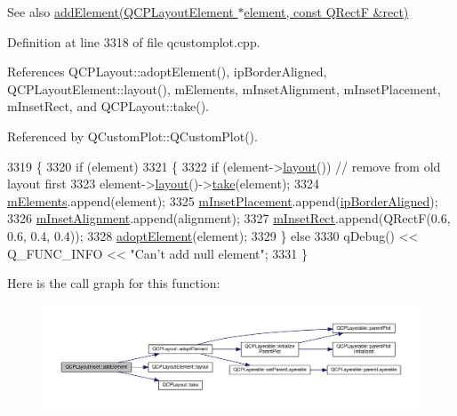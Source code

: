 \begin{DoxySeeAlso}{See also}
\hyperlink{class_q_c_p_layout_inset_a8ff61fbee4a1f0ff45c398009d9f1e56}{add\+Element(\+Q\+C\+P\+Layout\+Element $\ast$element, const Q\+Rect\+F \&rect)} 
\end{DoxySeeAlso}


Definition at line 3318 of file qcustomplot.\+cpp.



References Q\+C\+P\+Layout\+::adopt\+Element(), ip\+Border\+Aligned, Q\+C\+P\+Layout\+Element\+::layout(), m\+Elements, m\+Inset\+Alignment, m\+Inset\+Placement, m\+Inset\+Rect, and Q\+C\+P\+Layout\+::take().



Referenced by Q\+Custom\+Plot\+::\+Q\+Custom\+Plot().


\begin{DoxyCode}
3319 \{
3320   \textcolor{keywordflow}{if} (element)
3321   \{
3322     \textcolor{keywordflow}{if} (element->\hyperlink{class_q_c_p_layout_element_a6235f5384db871fc6e3387a1bc558b0d}{layout}()) \textcolor{comment}{// remove from old layout first}
3323       element->\hyperlink{class_q_c_p_layout_element_a6235f5384db871fc6e3387a1bc558b0d}{layout}()->\hyperlink{class_q_c_p_layout_ada26cd17e56472b0b4d7fbbc96873e4c}{take}(element);
3324     \hyperlink{class_q_c_p_layout_inset_a8fff7eae9a1be9a5c1e544fb379f682f}{mElements}.append(element);
3325     \hyperlink{class_q_c_p_layout_inset_a57a0a4e445cc78eada29765ecf092abe}{mInsetPlacement}.append(\hyperlink{class_q_c_p_layout_inset_a8b9e17d9a2768293d2a7d72f5e298192aa81e7df4a785ddee2229a8f47c46e817}{ipBorderAligned});
3326     \hyperlink{class_q_c_p_layout_inset_a55e9b84c310136ff985a6544184ab64a}{mInsetAlignment}.append(alignment);
3327     \hyperlink{class_q_c_p_layout_inset_aaa8f6b5029458f3d97a65239524a2b33}{mInsetRect}.append(QRectF(0.6, 0.6, 0.4, 0.4));
3328     \hyperlink{class_q_c_p_layout_af6dbbc24156a808da29cd1ec031729a3}{adoptElement}(element);
3329   \} \textcolor{keywordflow}{else}
3330     qDebug() << Q\_FUNC\_INFO << \textcolor{stringliteral}{"Can't add null element"};
3331 \}
\end{DoxyCode}


Here is the call graph for this function\+:\nopagebreak
\begin{figure}[H]
\begin{center}
\leavevmode
\includegraphics[width=350pt]{class_q_c_p_layout_inset_ad61529eb576af7f04dff94abb10c745a_cgraph}
\end{center}
\end{figure}




